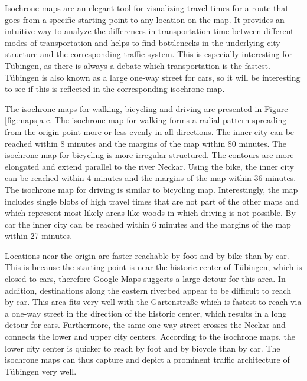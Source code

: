 \documentclass{article}
\begin{document}
Isochrone maps are an elegant tool for visualizing travel times for a route that goes from a specific starting point to any location on the map. It provides an intuitive way to analyze the differences in transportation time between different modes of transportation and helps to find bottlenecks in the underlying city structure and the corresponding traffic system. This is especially interesting for Tübingen, as there is always a debate which transportation is the fastest. Tübingen is also known as a large one-way street for cars, so it will be interesting to see if this is reflected in the corresponding isochrone map. 

The isochrone maps for walking, bicycling and driving are presented in Figure \ref{fig:maps}a-c. The isochrone map for walking forms a radial pattern spreading from the origin point more or less evenly in all directions. The inner city can be reached within 8 minutes and the margins of the map within 80 minutes. The isochrone map for bicycling is more irregular structured. The contours are more elongated and extend parallel to the river Neckar. Using the bike, the inner city can be reached within 4 minutes and the margins of the map within 36 minutes. The isochrone map for driving is similar to bicycling map. Interestingly, the map includes single blobs of high travel times that are not part of the other maps and which represent most-likely areas like woods in which driving is not possible. By car the inner city can be reached within 6 minutes and the margins of the map within 27 minutes.

Locations near the origin are faster reachable by foot and by bike than by car. This is because the starting point is near the historic center of Tübingen, which is closed to cars, therefore Google Maps suggests a large detour for this area. In addition, destinations along the eastern riverbed appear to be difficult to reach by car. This area fits very well with the Gartenstraße which is fastest to reach via a one-way street in the direction of the historic center, which results in a long detour for cars. Furthermore, the same one-way street crosses the Neckar and connects the lower and upper city centers. According to the isochrone maps, the lower city center is quicker to reach by foot and by bicycle than by car. The isochrone maps can thus capture and depict a prominent traffic architecture of Tübingen very well.
\end{document}

